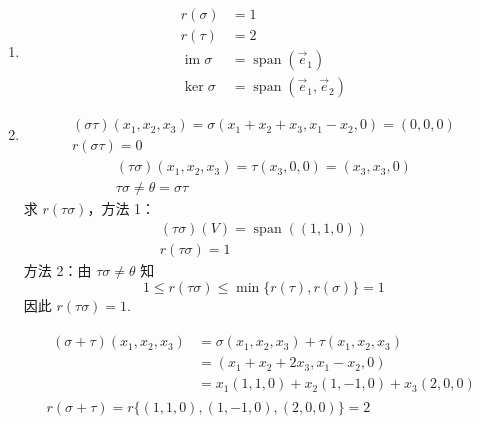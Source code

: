 \documentclass[12pt,fontset=fandol]{ctexart}
\begin{document}
\begin{solve}
\begin{enumerate}
                \item \begin{align*}
                          r(\sigma)   & = 1                          \\
                          r(\tau)     & = 2                          \\
                          \operatorname{im} \sigma  & = \operatorname{span}(\vec{e}_1)            \\
                          \ker \sigma & = \operatorname{span}(\vec{e}_1, \vec{e}_2)
                      \end{align*}

                \item \begin{gather*}
                          (\sigma \tau)(x_1, x_2, x_3) = \sigma(x_1 + x_2 + x_3, x_1 - x_2, 0) = (0, 0, 0) \\
                          r(\sigma \tau) = 0
                      \end{gather*}
                      \begin{gather*}
                          (\tau \sigma)(x_1, x_2, x_3) = \tau(x_3, 0, 0) = (x_3, x_3, 0) \\
                          \tau \sigma \neq \theta = \sigma \tau
                      \end{gather*}
                      求 $ r(\tau \sigma) $，方法 1：
                      \begin{gather*}
                          (\tau \sigma)(V) = \operatorname{span}((1, 1, 0)) \\
                          r(\tau \sigma) = 1
                      \end{gather*}
                      方法 2：由 $ \tau \sigma \neq \theta $ 知
                      \[ 1 \leqslant r(\tau \sigma) \leqslant \min\{r(\tau), r(\sigma)\} = 1 \]
                      因此 $ r(\tau \sigma) = 1 $.

                      \begin{gather*}
                          \begin{aligned}
                              (\sigma + \tau)(x_1, x_2, x_3) & = \sigma(x_1, x_2, x_3) + \tau(x_1, x_2, x_3) \\
                                                             & = (x_1 + x_2 + 2 x_3, x_1 - x_2, 0)           \\
                                                             & = x_1(1, 1, 0) + x_2(1, -1, 0) + x_3(2, 0, 0)
                          \end{aligned} \\
                          r(\sigma + \tau) = r\{(1, 1, 0), (1, -1, 0), (2, 0, 0)\} = 2
                      \end{gather*}


\end{enumerate}
\end{solve}
\end{document}
